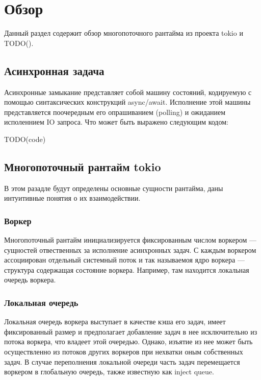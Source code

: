 
\section{Обзор}

Данный раздел содержит обзор многопоточного рантайма из проекта tokio и TODO().

\subsection{Асинхронная задача}


Асинхронные замыкание представляет собой машину состояний, кодируемую с помощью синтаксических конструкций async/await. Исполнение этой машины представляется поочередным его опрашиванием (polling) и ожиданием исполеннием IO запроса. Что может быть выражено следующим кодом:

TODO(code)

\subsection{Многопоточный рантайм tokio}

В этом разадле будут определены основные сущности рантайма, даны интуитивные понятия о их взаимодействии.

\subsubsection{Воркер}

Многопоточный рантайм инициализируется фиксированным числом воркером --- сущностей отвественных за исполнение асинхронных задач. С каждым воркером ассоциирован отдельный системный поток и так называемоя ядро воркера --- структура содержащая состояние воркера. Например, там находится локальная очередь воркера.

\subsubsection{Локальная очередь}

Локальная очередь воркера выступает в качестве кэша его задач, имеет фиксированный размер и предполагает добавление задач в нее исключительно из потока воркера, что владеет этой очередью. Однако, изъятие из нее может быть осуществленно из потоков других воркеров при нехватки оным собственных задач. В случае переполнения локальной очереди часть задач перемещается воркером в глобальную очередь, также известную как inject queue.

